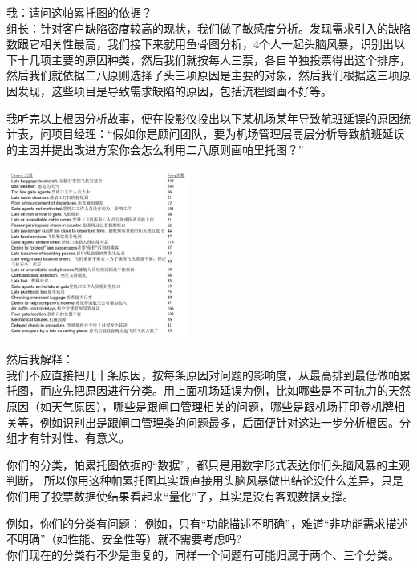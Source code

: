 我：请问这帕累托图的依据？\\
组长：针对客户缺陷密度较高的现状，我们做了敏感度分析。发现需求引入的缺陷数跟它相关性最高，我们接下来就用鱼骨图分析，4个人一起头脑风暴，识别出以下十几项主要的原因种类，然后我们就按每人三票，各自单独投票得出这个排序，然后我们就依据二八原则选择了头三项原因是主要的对象，然后我们根据这三项原因发现，这些项目是导致需求缺陷的原因，包括流程图画不好等。

我听完以上根因分析故事，便在投影仪投出以下某机场某年导致航班延误的原因统计表，问项目经理：``假如你是顾问团队，要为机场管理层高层分析导致航班延误的主因并提出改进方案你会怎么利用二八原则画帕里托图？''

\begin{description}
\item[]
\end{description}

\includegraphics[width=6cm]{CRairportDelayScreenshot_2023-06-02_191306.jpg}


然后我解释：\\
我们不应直接把几十条原因，按每条原因对问题的影响度，从最高排到最低做帕累托图，而应先把原因进行分类。用上面机场延误为例，比如哪些是不可抗力的天然原因（如天气原因），哪些是跟闸口管理相关的问题，哪些是跟机场打印登机牌相关等，例如识别出是跟闸口管理类的问题最多，后面便针对这进一步分析根因。分组才有针对性、有意义。

你们的分类，帕累托图依据的``数据''，都只是用数字形式表达你们头脑风暴的主观判断，
所以你用这种帕累托图其实跟直接用头脑风暴做出结论没什么差异，只是你们用了投票数据使结果看起来``量化''了，其实是没有客观数据支撑。

例如，你们的分类有问题：
例如，只有``功能描述不明确''，难道``非功能需求描述不明确''（如性能、安全性等）就不需要考虑吗?\\
你们现在的分类有不少是重复的，同样一个问题有可能归属于两个、三个分类。

